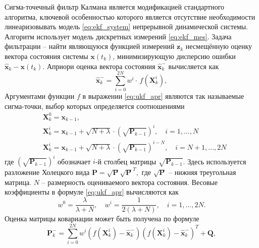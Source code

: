 Сигма-точечный фильтр Калмана является модификацией стандартного алгоритма, ключевой особенностью которого является отсутствие необходимости линеаризовывать модель \eqref{eq:ekf_system} непрерывной динамической системы. Алгоритм использует модель дискретных измерений \eqref{eq:ekf_mes}.
Задача фильтрации -- найти являющуюся функцией измерений $\bm z_k$ несмещённую оценку вектора состояния системы  $\bm x(t_k)$, минимизирующую дисперсию ошибки  ${\hat{\bm{x}}_k} - \bm x({t_k})$.
Априори оценка вектора состояния $\bm{\hat x}_k^-$ вычисляется как
\begin{equation} \label{eq:ukf_apr}
{\bm{\hat x}}_k^-  = \sum\limits_{i = 0}^{2N} {{w^i} \cdot } \,f\left( {{\bm{X}}_k^i} \right),
\end{equation}
Аргументами функции $f$ в выражении \eqref{eq:ukf_apr} являются так называемые сигма-точки, выбор которых определяется соотношениями
\begin{equation} \label{eq:ukf_points}
\begin{aligned}
&{{\bm{X}}_k^0 = {{\bm{x}}_{k - 1}}},
\\
&{{\bm{X}}_k^i = {{\bm{x}}_{k - 1}} + \sqrt {N + {{\lambda }}}  \cdot {{\left( {\sqrt {{{\bm{P}}_{k - 1}}} } \right)}^i}}, \quad {i = 1,...,N}
\\
&{{\bm{X}}_k^i = {{\bm{x}}_{k - 1}} + \sqrt {N + {{\lambda }}}  \cdot {{\left( {\sqrt {{{\bm{P}}_{k - 1}}} } \right)}^{i - N}}}, \quad {i = N + 1,...,2N}
\end{aligned}
\end{equation}
где
${{{\left( {\sqrt {{{\bm{P}}_{k - 1}}} } \right)}^i}}$
обозначает  $i$-й столбец матрицы ${\sqrt {{{\bm{P}}_{k - 1}}} }$.  Здесь используется разложение Холецкого \cite{Verbjitsky01} вида
${\bm{P}} = \sqrt {\bm{P}} {\sqrt {\bm{P}} ^T},$
где $\sqrt {\bm{P}}$ -- нижняя треугольная матрица. $N$ -- размерность оцениваемого вектора состояния. Весовые коэффициенты в формуле \eqref{eq:ukf_apr} вычисляются как
\begin{equation} \label{eq:ukf_weights}
{w^0} = \frac{{{\lambda }}}{{{{\lambda }} + N}},
\quad
{w^i} = \frac{1}{{2\left( {{{\lambda }} + N} \right)}},
\quad
i = 1,...,2N.
\end{equation}
Оценка матрицы ковариации может быть получена по формуле
\begin{equation} \label{eq:ukf_p_apr}
{\bm{P}}_k^ -  = \sum\limits_{i = 0}^{2N} {{w^i}\left( {f\left( {{\bm{X}}_k^i} \right) - {\bm{\hat x}}_k^ - } \right)} {\left( {f\left( {{\bm{X}}_k^i} \right) - {\bm{\hat x}}_k^ - } \right)^{{T}}} + {\bm{Q}},
\end{equation}
